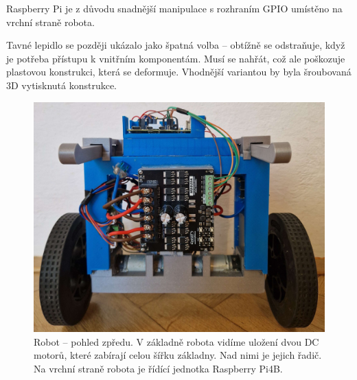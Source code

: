 Raspberry Pi je z důvodu snadnější manipulace s rozhraním GPIO umístěno na vrchní straně robota.

Tavné lepidlo se později ukázalo jako špatná volba -- obtížně se odstraňuje, když je potřeba přístupu k vnitřním komponentám. Musí se nahřát, což ale poškozuje plastovou konstrukci, která se deformuje. Vhodnější variantou by byla šroubovaná 3D vytisknutá konstrukce.

\begin{figure}[H]
    \centering
    \includegraphics[width=0.9\linewidth]{obrazky-figures/front.jpg}
    \caption {Robot -- pohled zpředu. V základně robota vidíme uložení dvou DC motorů, které zabírají celou šířku základny. Nad nimi je jejich řadič. Na vrchní straně robota je řídící jednotka Raspberry Pi4B.}
    \label{robot-front}
\end{figure}


